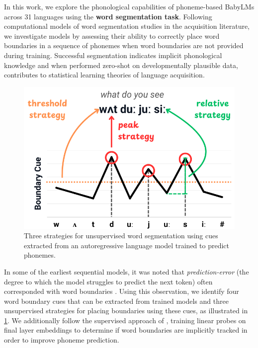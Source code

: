 
In this work, we explore the phonological capabilities of phoneme-based BabyLMs across 31 languages using the \textbf{word segmentation task}. Following computational models of word segmentation studies in the acquisition literature, we investigate models by assessing their ability to correctly place word boundaries in a sequence of phonemes when word boundaries are not provided during training. Successful segmentation indicates implicit phonological knowledge and when performed zero-shot on developmentally plausible data, contributes to statistical learning theories of language acquisition. 

\begin{figure}[t]
    \centering
    \includegraphics[width=0.95\linewidth]{Figures/15Segmentation/overvieww.png}
    \caption{Three strategies for unsupervised word segmentation using cues extracted from an autoregressive language model trained to predict phonemes.}
    \label{fig:15-example}
\end{figure}

In some of the earliest sequential models, it was noted that \emph{prediction-error} (the degree to which the model struggles to predict the next token) often corresponded with word boundaries \citep{elman-1990-finding}. Using this observation,
we identify four word boundary cues that can be extracted from trained models and three unsupervised strategies for placing boundaries using these cues, as illustrated in \cref{fig:15-example}. We additionally follow the supervised approach of \citet{hahn-baroni-2019-tabula}, training linear probes on final layer embeddings to determine if word boundaries are implicitly tracked in order to improve phoneme prediction.

